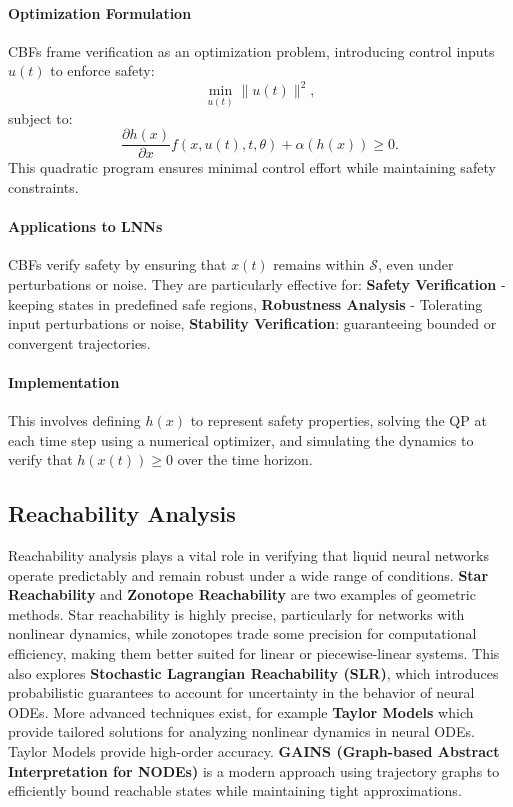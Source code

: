 \paragraph{Optimization Formulation}
CBFs frame verification as an optimization problem, introducing control inputs \(u(t)\) to enforce safety:
\[
\min_{u(t)} \|u(t)\|^2,
\]
subject to:
\[
\frac{\partial h(x)}{\partial x} f(x, u(t), t, \theta) + \alpha(h(x)) \geq 0.
\]
This quadratic program ensures minimal control effort while maintaining safety constraints.

\paragraph{Applications to LNNs}
CBFs verify safety by ensuring that \(x(t)\) remains within \(\mathcal{S}\), even under perturbations or noise. They are particularly effective for: \textbf{Safety Verification} - keeping states in predefined safe regions, \textbf{Robustness Analysis} - Tolerating input perturbations or noise, \textbf{Stability Verification}: guaranteeing bounded or convergent trajectories.

\paragraph{Implementation}
This involves defining \(h(x)\) to represent safety properties, solving the QP at each time step using a numerical optimizer, and simulating the dynamics to verify that \(h(x(t)) \geq 0\) over the time horizon.

\subsection{Reachability Analysis}

Reachability analysis plays a vital role in verifying that liquid neural networks operate predictably and remain robust under a wide range of conditions. \textbf{Star Reachability} and \textbf{Zonotope Reachability} are two examples of geometric methods. Star reachability is highly precise, particularly for networks with nonlinear dynamics, while zonotopes trade some precision for computational efficiency, making them better suited for linear or piecewise-linear systems. This also explores \textbf{Stochastic Lagrangian Reachability (SLR)}, which introduces probabilistic guarantees to account for uncertainty in the behavior of neural ODEs. More advanced techniques exist, for example \textbf{Taylor Models} which provide tailored solutions for analyzing nonlinear dynamics in neural ODEs. Taylor Models provide high-order accuracy. \textbf{GAINS (Graph-based Abstract Interpretation for NODEs)} is a modern approach using trajectory graphs to efficiently bound reachable states while maintaining tight approximations.

